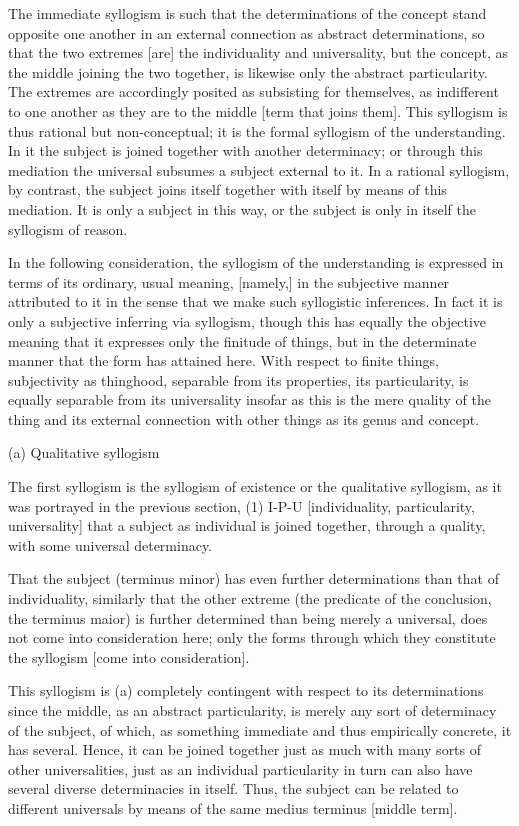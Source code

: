 The immediate syllogism is such that
the determinations of the concept stand opposite one another
in an external connection as abstract determinations,
so that the two extremes [are] the individuality and universality,
but the concept, as the middle joining the two together,
is likewise only the abstract particularity.
The extremes are accordingly posited
as subsisting for themselves,
as indifferent to one another as
they are to the middle [term that joins them].
This syllogism is thus rational but non-conceptual;
it is the formal syllogism of the understanding.
In it the subject is joined together with another determinacy;
or through this mediation the universal
subsumes a subject external to it.
In a rational syllogism, by contrast,
the subject joins itself together with itself
by means of this mediation.
It is only a subject in this way,
or the subject is only in itself
the syllogism of reason.

In the following consideration,
the syllogism of the understanding is expressed
in terms of its ordinary, usual meaning, [namely,]
in the subjective manner attributed to it
in the sense that we make such syllogistic inferences.
In fact it is only a subjective inferring via syllogism,
though this has equally the objective meaning
that it expresses only the finitude of things,
but in the determinate manner that the form has attained here.
With respect to finite things, subjectivity as thinghood,
separable from its properties, its particularity, is
equally separable from its universality insofar as this is
the mere quality of the thing
and its external connection with other things
as its genus and concept.

(a) Qualitative syllogism

The first syllogism is the syllogism of existence
or the qualitative syllogism,
as it was portrayed in the previous section,
(1) I-P-U
[individuality, particularity, universality]
that a subject as individual is joined together,
through a quality, with some universal determinacy.

That the subject (terminus minor) has even further determinations
than that of individuality, similarly that the other extreme
(the predicate of the conclusion, the terminus maior) is
further determined than being merely a universal,
does not come into consideration here;
only the forms through which they constitute the syllogism
[come into consideration].

This syllogism is (a) completely contingent
with respect to its determinations
since the middle, as an abstract particularity,
is merely any sort of determinacy of the subject,
of which, as something immediate and thus empirically concrete,
it has several.
Hence, it can be joined together just as much
with many sorts of other universalities,
just as an individual particularity in turn
can also have several diverse determinacies in itself.
Thus, the subject can be related to different universals
by means of the same medius terminus [middle term].

